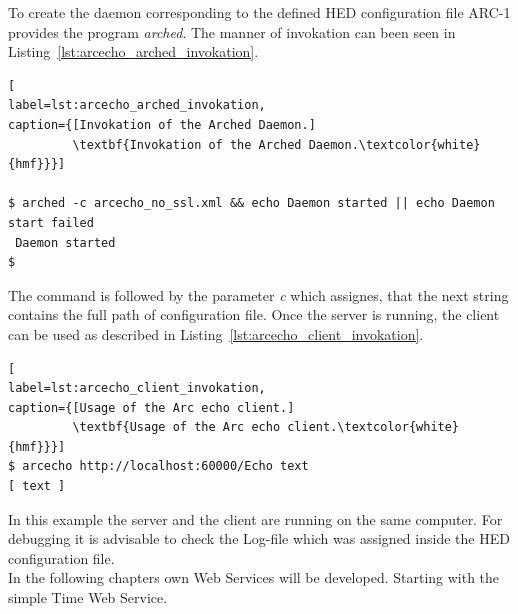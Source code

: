 To create the daemon corresponding to the defined HED configuration file ARC-1 provides the program \textit{arched}.
The manner of invokation can been seen in Listing~\ref{lst:arcecho_arched_invokation}.
\begin{program}
\begin{lstlisting}[
label=lst:arcecho_arched_invokation,
caption={[Invokation of the Arched Daemon.]
         \textbf{Invokation of the Arched Daemon.\textcolor{white}{hmf}}}]

$ arched -c arcecho_no_ssl.xml && echo Daemon started || echo Daemon start failed
 Daemon started
$
\end{lstlisting}
\end{program}
%
%
The command is followed by the parameter \textit{c} which assignes, that the next string contains the full path of configuration file.
Once the server is running, the client can be used as described in Listing~\ref{lst:arcecho_client_invokation}.
\begin{program}
\begin{lstlisting}[
label=lst:arcecho_client_invokation,
caption={[Usage of the Arc echo client.]
         \textbf{Usage of the Arc echo client.\textcolor{white}{hmf}}}]
$ arcecho http://localhost:60000/Echo text
[ text ]
\end{lstlisting}
\end{program}
In this example the server and the client are running on the same computer. For debugging it is advisable to check the Log-file which was assigned inside the HED configuration file.\\


In the following chapters own Web Services will be developed. Starting with the simple Time Web Service.













